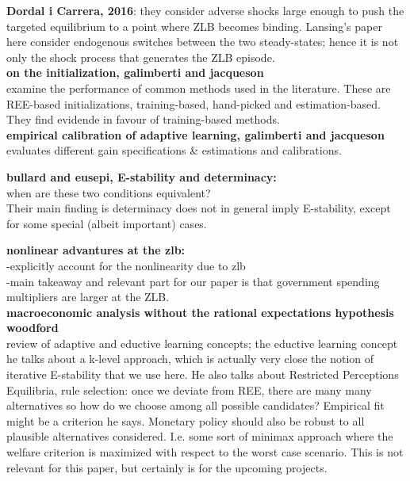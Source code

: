 \documentclass[12pt,reqno]{article}
\numberwithin{equation}{section}
\begin{document}
\textbf{Dordal i Carrera, 2016}: they consider adverse shocks large enough to push the targeted equilibrium to a point where ZLB becomes binding. Lansing's paper here consider endogenous switches between the two steady-states; hence it is not only the shock process that generates the ZLB episode. \\

\textbf{on the initialization, galimberti and jacqueson} \\
examine the performance of common methods used in the literature. These are REE-based initializations, training-based, hand-picked and estimation-based. They find evidende in favour of training-based methods.\\

\textbf{empirical calibration of adaptive learning, galimberti and jacqueson} \\ 

evaluates different gain specifications \& estimations and calibrations. 


\textbf{bullard and eusepi, E-stability and determinacy:} \\
when are these two conditions equivalent? \\
Their main finding is determinacy does not in general imply E-stability, except for some special (albeit important) cases. 

\textbf{nonlinear advantures at the zlb:} \\
-explicitly account for the nonlinearity due to zlb\\
-main takeaway and relevant part for our paper is that government spending multipliers are larger at the ZLB. \\

\textbf{macroeconomic analysis without the rational expectations hypothesis woodford}\\

review of adaptive and eductive learning concepts; the eductive learning  concept he talks about a k-level approach, which is actually very close the notion of iterative E-stability that we use here. He also talks about Restricted Perceptions Equilibria, rule selection: once we deviate from REE, there are many many alternatives so how do we choose among all possible candidates? Empirical fit might be a criterion he says. Monetary policy should also be robust to all plausible alternatives considered. I.e. some sort of minimax approach where the welfare criterion is maximized with respect to the worst case scenario. This is not relevant for this paper, but certainly is for the upcoming projects. \\
\end{document}
